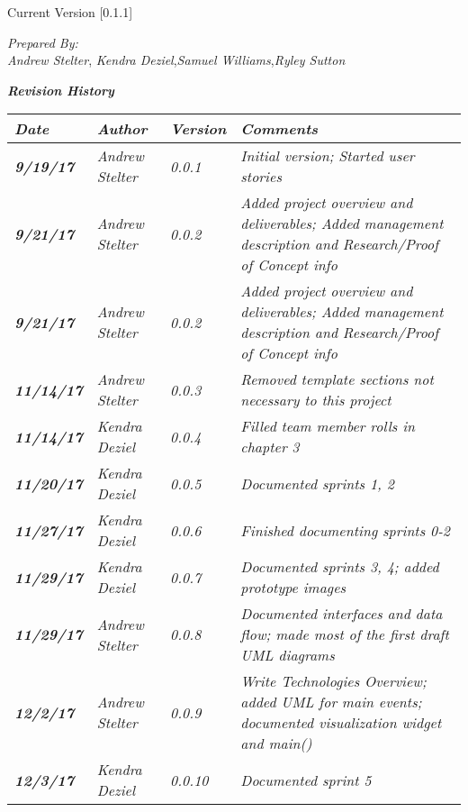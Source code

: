 


Current Version [0.1.1]
\vspace*{5mm}

{\color{SDColor5}
\noindent
\textit{Prepared By:}\\
\textit{Andrew Stelter}, \textit{Kendra Deziel},\textit{Samuel Williams},\textit{Ryley Sutton}
}

\vfill
\noindent
{\color{SDColor3} \textit{\textbf{Revision History}}}\\
\begin{tabular}{|>{\raggedright}p{1.5cm}|>{\raggedright}p{3cm}|>{\raggedright}p{1.5cm}|>{\raggedright}p{9cm}|}
\hline
\textit{\textbf{Date}} &  \textit{\textbf{Author}} & \textit{\textbf{Version}} & \textit{\textbf{Comments}}\tabularnewline
\hline
 \textit{\textbf{9/19/17}} & \textit{Andrew Stelter} & \textit{0.0.1} & \textit{Initial version; Started user stories}\tabularnewline
\hline
\textit{\textbf{9/21/17}} & \textit{Andrew Stelter} & \textit{0.0.2} & \textit{Added project overview and deliverables; Added management description and Research/Proof of Concept info }\tabularnewline
\hline
\textit{\textbf{9/21/17}} & \textit{Andrew Stelter} & \textit{0.0.2} & \textit{Added project overview and deliverables; Added management description and Research/Proof of Concept info }\tabularnewline
\hline
\textit{\textbf{11/14/17}} & \textit{Andrew Stelter} & \textit{0.0.3} & \textit{Removed template sections not necessary to this project}\tabularnewline
\hline
\textit{\textbf{11/14/17}} & \textit{Kendra Deziel} & \textit{0.0.4} & \textit{Filled team member rolls in chapter 3}\tabularnewline
\hline
\textit{\textbf{11/20/17}} & \textit{Kendra Deziel} & \textit{0.0.5} & \textit{Documented sprints 1, 2}\tabularnewline
\hline
\textit{\textbf{11/27/17}} & \textit{Kendra Deziel} & \textit{0.0.6} & \textit{Finished documenting sprints 0-2}\tabularnewline
\hline
\textit{\textbf{11/29/17}} & \textit{Kendra Deziel} & \textit{0.0.7} & \textit{Documented sprints 3, 4; added prototype images}\tabularnewline
\hline
\textit{\textbf{11/29/17}} & \textit{Andrew Stelter} & \textit{0.0.8} & \textit{Documented interfaces and data flow; made most of the first draft UML diagrams}\tabularnewline
\hline
\textit{\textbf{12/2/17}} & \textit{Andrew Stelter} & \textit{0.0.9} & \textit{Write Technologies Overview; added UML for main events; documented visualization widget and main()}\tabularnewline
\hline
\textit{\textbf{12/3/17}} & \textit{Kendra Deziel} & \textit{0.0.10} & \textit{Documented sprint 5}\tabularnewline

\end{tabular}
